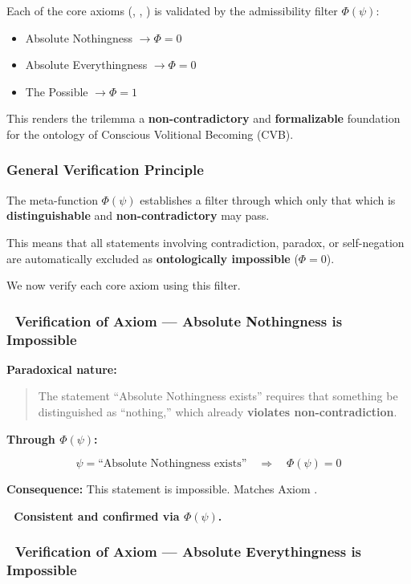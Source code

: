 \documentclass[12pt]{article}
\begin{document}
Each of the core axioms (\text{[1]}, \text{[2]}, \text{[3]}) is validated by the admissibility filter $\Phi(\psi)$:

\begin{itemize}
\item Absolute Nothingness $\rightarrow \Phi = 0$
\item Absolute Everythingness $\rightarrow \Phi = 0$
\item The Possible $\rightarrow \Phi = 1$
\end{itemize}

This renders the trilemma a \textbf{non-contradictory} and \textbf{formalizable} foundation for the ontology of Conscious Volitional Becoming (CVB).

\subsubsection*{General Verification Principle}

The meta-function $\Phi(\psi)$ establishes a filter through which only that which is \textbf{distinguishable} and \textbf{non-contradictory} may pass.

This means that all statements involving contradiction, paradox, or self-negation are automatically excluded as \textbf{ontologically impossible} ($\Phi = 0$).

We now verify each core axiom using this filter.

\subsubsection*{🔹 Verification of Axiom \text{[1]} — Absolute Nothingness is Impossible}

\textbf{Paradoxical nature:}

\begin{quote}
The statement ``Absolute Nothingness exists'' requires that something be distinguished as ``nothing,'' which already \textbf{violates non-contradiction}.
\end{quote}

\textbf{Through $\Phi(\psi)$:}

\[
\psi = \text{``Absolute Nothingness exists''} \quad \Rightarrow \quad \Phi(\psi) = 0
\]

\textbf{Consequence:} This statement is impossible. Matches Axiom \text{[1]}.

\textbf{🔹 Consistent and confirmed via $\Phi(\psi)$.}

\subsubsection*{🔹 Verification of Axiom \text{[2]} — Absolute Everythingness is Impossible}
\end{document}
